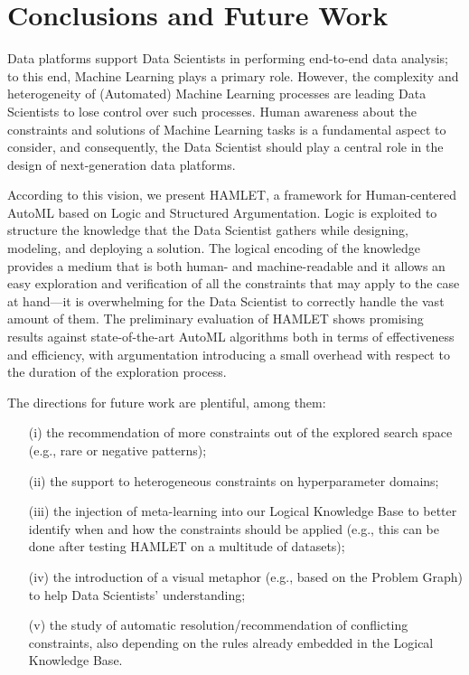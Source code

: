 \section{Conclusions and Future Work}\label{sec:conclusion}

Data platforms support Data Scientists in performing end-to-end data analysis; to this end, Machine Learning plays a primary role.
However, the complexity and heterogeneity of (Automated) Machine Learning processes are leading Data Scientists to lose control over such processes.
Human awareness about the constraints and solutions of Machine Learning tasks is a fundamental aspect to consider, and consequently, the Data Scientist should play a central role in the design of next-generation data platforms.

According to this vision, we present HAMLET, a framework for Human-centered AutoML based on Logic and Structured Argumentation.
Logic is exploited to structure the knowledge that the Data Scientist gathers while designing, modeling, and deploying a solution.
The logical encoding of the knowledge provides a medium that is both human- and machine-readable and it allows an easy exploration and verification of all the constraints that may apply to the case at hand---it is overwhelming for the Data Scientist to correctly handle the vast amount of them.
The preliminary evaluation of HAMLET shows promising results against state-of-the-art AutoML algorithms both in terms of effectiveness and efficiency, with argumentation introducing a small overhead with respect to the duration of the exploration process.

The directions for future work are plentiful, among them:
\begin{itemize}
    \item[(i)] the recommendation of more constraints out of the explored search space (e.g., rare or negative patterns);
    \item[(ii)] the support to heterogeneous constraints on hyperparameter domains;
    \item[(iii)] the injection of meta-learning into our Logical Knowledge Base to better identify when and how the constraints should be applied (e.g., this can be done after testing HAMLET on a multitude of datasets);
    \item[(iv)] the introduction of a visual metaphor (e.g., based on the Problem Graph) to help Data Scientists' understanding;
    \item[(v)] the study of automatic resolution/recommendation of conflicting constraints, also depending on the rules already embedded in the Logical Knowledge Base.
\end{itemize}
